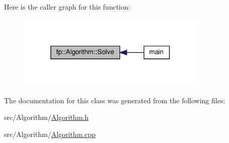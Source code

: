 Here is the caller graph for this function\+:
\nopagebreak
\begin{figure}[H]
\begin{center}
\leavevmode
\includegraphics[width=257pt]{classfp_1_1_algorithm_a2e66300e1507ff3f71d5fbbffede52a3_icgraph}
\end{center}
\end{figure}


The documentation for this class was generated from the following files\+:\begin{DoxyCompactItemize}
\item 
src/\+Algorithm/\hyperlink{_algorithm_8h}{Algorithm.\+h}\item 
src/\+Algorithm/\hyperlink{_algorithm_8cpp}{Algorithm.\+cpp}\end{DoxyCompactItemize}
